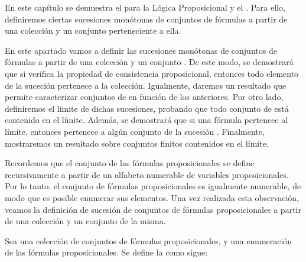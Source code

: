 %
\begin{isabellebody}%
%
%
\isadelimtheory
%
\endisadelimtheory
%
\isatagtheory
%
\endisatagtheory
{\isafoldtheory}%
%
\isadelimtheory
%
\endisadelimtheory
%
\begin{isamarkuptext}%
En este capítulo se demuestra el  para la Lógica 
  Proposicional y el . Para ello, definiremos ciertas sucesiones monótonas 
  de conjuntos de fórmulas a partir de una colección y un conjunto perteneciente a ella.%
\end{isamarkuptext}\isamarkuptrue%
%
\isadelimdocument
%
\endisadelimdocument
%
\isatagdocument
%
\isamarkuptrue%
%
\endisatagdocument
{\isafolddocument}%
%
\isadelimdocument
%
\endisadelimdocument
%
\begin{isamarkuptext}%
En este apartado vamos a definir las sucesiones monótonas  de conjuntos de fórmulas a 
  partir de una colección  y un conjunto . De este modo, se demostrará que si
   verifica la propiedad de consistencia proposicional, entonces todo elemento de la suceción
   pertenece a la colección. Igualmente, daremos un resultado que permite caracterizar 
  conjuntos de  en función de los anteriores. Por otro lado, definiremos el límite de dichas 
  sucesiones, probando que todo conjunto de  está contenido en el límite. Además, se
  demostrará que si una fórmula pertenece al límite, entonces pertenece a algún conjunto de
  la sucesión . Finalmente, mostraremos un resultado sobre conjuntos finitos contenidos en
  el límite.

  Recordemos que el conjunto de las fórmulas proposicionales se define recursivamente a partir 
  de un alfabeto numerable de variables proposicionales. Por lo tanto, el conjunto de fórmulas 
  proposicionales es igualmente numerable, de modo que es posible enumerar sus elementos. Una vez 
  realizada esta observación, veamos la definición de sucesión de conjuntos de fórmulas 
  proposicionales a partir de una colección y un conjunto de la misma.

\begin{definicion}
  Sea  una colección de conjuntos de fórmulas proposicionales,  y  una 
  enumeración de las fórmulas proposicionales. Se define la  como sigue:


\end{definicion}
\end{isamarkuptext}
\end{isabellebody}
